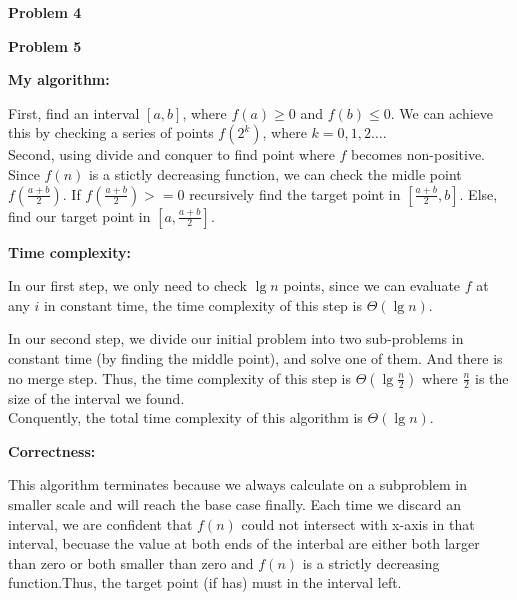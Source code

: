 \documentclass[12pt,letterpaper]{article}
\def\pp{\par\noindent}
\newcommand{\problem}[1]{ \bigskip \pp \textbf{Problem #1}\par}
\begin{document}
\problem{4}

\problem{5}
\textbf{My algorithm:}\par
First, find an interval $[a, b]$, where $f(a)\geq0$ and $f(b)\leq0$. We can achieve this by checking a series of points $f(2^k)$, where $k=0, 1, 2\dots$.\\
Second, using divide and conquer to find point where $f$ becomes non-positive. Since $f(n)$ is a stictly decreasing function, we can check the midle point $f(\frac{a+b}{2})$. If $f(\frac{a+b}{2})>=0$ recursively find the target point in $[\frac{a+b}{2}, b]$. Else, find our target point in $[a, \frac{a+b}{2}]$.\par
\textbf{Time complexity:}\par
In our first step, we only need to check $\lg n$ points, since we can evaluate $f$ at any $i$ in constant time, the time complexity of this step is $\Theta(\lg n)$.\par
In our second step, we divide our initial problem into two sub-problems in constant time (by finding the middle point), and solve one of them. And there is no merge step. Thus, the time complexity of this step is $\Theta(\lg \frac{n}{2})$ where $\frac{n}{2}$ is the size of the interval we found.\\
Conquently, the total time complexity of this algorithm is $\Theta(\lg n)$.\par
\textbf{Correctness:}\par
This algorithm terminates because we always calculate on a subproblem in smaller scale and will reach the base case finally. Each time we discard an interval, we are confident that $f(n)$ could not intersect with x-axis in that interval, becuase the value at both ends of the interbal are either both larger than zero or both smaller than zero and $f(n)$ is a strictly decreasing function.Thus, the target point (if has) must in the interval left.\par
\end{document}
